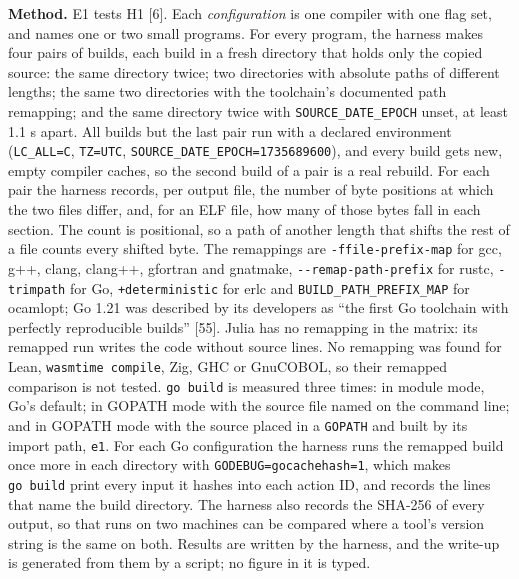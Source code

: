 \documentclass[10pt,letterpaper]{article}
\begin{document}
\textbf{Method.} E1 tests H1 {[}6{]}. Each \emph{configuration} is one
compiler with one flag set, and names one or two small programs. For
every program, the harness makes four pairs of builds, each build in a
fresh directory that holds only the copied source: the same directory
twice; two directories with absolute paths of different lengths; the
same two directories with the toolchain's documented path remapping; and
the same directory twice with \texttt{SOURCE\_\allowbreak{}DATE\_\allowbreak{}EPOCH} unset, at
least 1.1 s apart. All builds but the last pair run with a declared
environment (\texttt{LC\_ALL=C}, \texttt{TZ=UTC},
\texttt{SOURCE\_\allowbreak{}DATE\_\allowbreak{}EPOCH=1735689600}), and every build gets new,
empty compiler caches, so the second build of a pair is a real rebuild.
For each pair the harness records, per output file, the number of byte
positions at which the two files differ, and, for an ELF file, how many
of those bytes fall in each section. The count is positional, so a path
of another length that shifts the rest of a file counts every shifted
byte. The remappings are \texttt{-\allowbreak{}ffile-\allowbreak{}prefix-\allowbreak{}map} for gcc, g++, clang,
clang++, gfortran and gnatmake, \texttt{-\allowbreak{}\/\allowbreak{}-\allowbreak{}remap-\allowbreak{}path-\allowbreak{}prefix} for
rustc, \texttt{-trimpath} for Go, \texttt{+deterministic} for erlc and
\texttt{BUILD\_\allowbreak{}PATH\_\allowbreak{}PREFIX\_\allowbreak{}MAP} for ocamlopt; Go 1.21 was described by
its developers as ``the first Go toolchain with perfectly reproducible
builds'' {[}55{]}. Julia has no remapping in the matrix: its remapped
run writes the code without source lines. No remapping was found for
Lean, \texttt{wasmtime\ compile}, Zig, GHC or GnuCOBOL, so their
remapped comparison is not tested. \texttt{go\ build} is measured three
times: in module mode, Go's default; in GOPATH mode with the source file
named on the command line; and in GOPATH mode with the source placed in
a \texttt{GOPATH} and built by its import path, \texttt{e1}. For each Go
configuration the harness runs the remapped build once more in each
directory with \texttt{GODEBUG=gocachehash=1}, which makes
\texttt{go\ build} print every input it hashes into each action ID, and
records the lines that name the build directory. The harness also
records the SHA-256 of every output, so that runs on two machines can be
compared where a tool's version string is the same on both. Results are
written by the harness, and the write-up is generated from them by a
script; no figure in it is typed.
\end{document}
